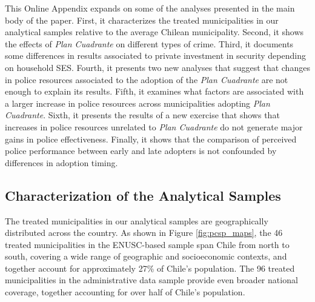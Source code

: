 This Online Appendix expands on some of the analyses presented in the main body of the paper. First, it characterizes the treated municipalities in our analytical samples relative to the average Chilean municipality. Second, it shows the effects of \emph{Plan Cuadrante} on different types of crime. Third, it documents some differences in results associated to private investment in security depending on household SES. Fourth, it presents two new analyses that suggest that changes in police resources associated to the adoption of the \emph{Plan Cuadrante} are not enough to explain its results. Fifth, it examines what factors are associated with a larger increase in police resources across municipalities adopting \emph{Plan Cuadrante}. Sixth, it presents the results of a new exercise that shows that increases in police resources unrelated to \emph{Plan Cuadrante} do not generate major gains in police effectiveness. Finally, it shows that the comparison of perceived police performance between early and late adopters is not confounded by differences in adoption timing.


\subsection{Characterization of the Analytical Samples}
\label{sec:ext_validity}

The treated municipalities in our analytical samples are geographically distributed across the country. As shown in Figure \ref{fig:pcsp_maps}, the 46 treated municipalities in the ENUSC-based sample span Chile from north to south, covering a wide range of geographic and socioeconomic contexts, and together account for approximately 27\% of Chile's population. The 96 treated municipalities in the administrative data sample provide even broader national coverage, together accounting for over half of Chile's population.

